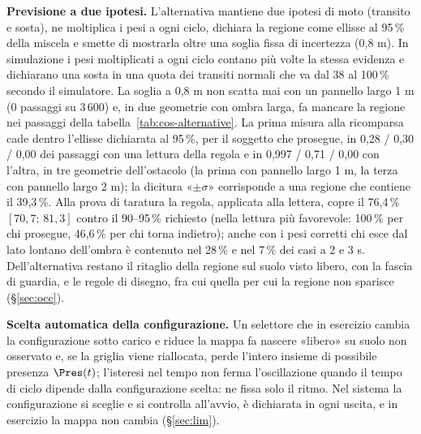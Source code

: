 \textbf{Previsione a due ipotesi.} L'alternativa mantiene due ipotesi di moto (transito e sosta), ne moltiplica i pesi a ogni ciclo, dichiara la regione come ellisse al 95\,\% della miscela e smette di mostrarla oltre una soglia fissa di incertezza (0,8 m). In simulazione i pesi moltiplicati a ogni ciclo contano più volte la stessa evidenza e dichiarano una sosta in una quota dei transiti normali che va dal 38 al 100\,\% secondo il simulatore. La soglia a 0,8 m non scatta mai con un pannello largo 1 m (0 passaggi su $3\,600$) e, in due geometrie con ombra larga, fa mancare la regione nei passaggi della tabella~\ref{tab:cos-alternative}. La prima misura alla ricomparsa cade dentro l'ellisse dichiarata al 95\,\%, per il soggetto che prosegue, in 0,28 / 0,30 / 0,00 dei passaggi con una lettura della regola e in 0,997 / 0,71 / 0,00 con l'altra, in tre geometrie dell'ostacolo (la prima con pannello largo 1 m, la terza con pannello largo 2 m); la dicitura «$\pm\sigma$» corrisponde a una regione che contiene il 39,3\,\%. Alla prova di taratura la regola, applicata alla lettera, copre il 76,4\,\% $[70{,}7;\,81{,}3]$ contro il 90--95\,\% richiesto (nella lettura più favorevole: 100\,\% per chi prosegue, 46,6\,\% per chi torna indietro); anche con i pesi corretti chi esce dal lato lontano dell'ombra è contenuto nel 28\,\% e nel 7\,\% dei casi a 2 e 3 s. Dell'alternativa restano il ritaglio della regione sul suolo visto libero, con la fascia di guardia, e le regole di disegno, fra cui quella per cui la regione non sparisce (\S\ref{sec:occ}). 

\textbf{Scelta automatica della configurazione.} Un selettore che in esercizio cambia la configurazione sotto carico e riduce la mappa fa nascere «libero» su suolo non osservato e, se la griglia viene riallocata, perde l'intero insieme di possibile presenza $\Pres(t)$; l'isteresi nel tempo non ferma l'oscillazione quando il tempo di ciclo dipende dalla configurazione scelta: ne fissa solo il ritmo. Nel sistema la configurazione si sceglie e si controlla all'avvio, è dichiarata in ogni uscita, e in esercizio la mappa non cambia (\S\ref{sec:lim}). 

